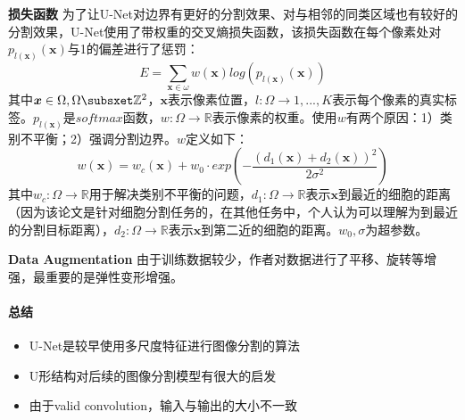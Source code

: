 \par{\textbf{损失函数}}
为了让U-Net对边界有更好的分割效果、对与相邻的同类区域也有较好的分割效果，U-Net使用了带权重的交叉熵损失函数，该损失函数在每个像素处对$p_{l(\boldsymbol{x})}(\boldsymbol{x})$与1的偏差进行了惩罚：
$$
E = \sum_{\boldsymbol{x} \in \omega} w(\boldsymbol{x}) log(p_{l(\boldsymbol{x})}(\boldsymbol{x}))
$$
其中$\boldsymbol{x} \in \Omega, \Omega \subsxet \mathbb{Z}^2$，$\boldsymbol{x}$表示像素位置，$l: \Omega \rightarrow {1, ..., K}$表示每个像素的真实标签。$p_{l(\boldsymbol{x})}$是$softmax$函数，$w: \Omega \rightarrow \mathbb{R}$表示像素的权重。使用$w$有两个原因：1）类别不平衡；2）强调分割边界。$w$定义如下：
$$
w(\boldsymbol{x}) = w_c(\boldsymbol{x}) + w_0 \cdot exp(-\frac{(d_1(\boldsymbol{x}) + d_2(\boldsymbol{x}))^2}{2\sigma^2})
$$
其中$w_c: \Omega \rightarrow \mathbb{R}$用于解决类别不平衡的问题，$d_1: \Omega \rightarrow \mathbb{R}$表示$\boldsymbol{x}$到最近的细胞的距离（因为该论文是针对细胞分割任务的，在其他任务中，个人认为可以理解为到最近的分割目标距离），$d_2: \Omega \rightarrow \mathbb{R}$表示$\boldsymbol{x}$到第二近的细胞的距离。$w_0, \sigma$为超参数。

\par{\textbf{Data Augmentation}}
由于训练数据较少，作者对数据进行了平移、旋转等增强，最重要的是弹性变形增强。

\paragraph{总结}

\begin{itemize}

	\item U-Net是较早使用多尺度特征进行图像分割的算法
	\item U形结构对后续的图像分割模型有很大的启发
	\item 由于valid convolution，输入与输出的大小不一致

\end{itemize}

